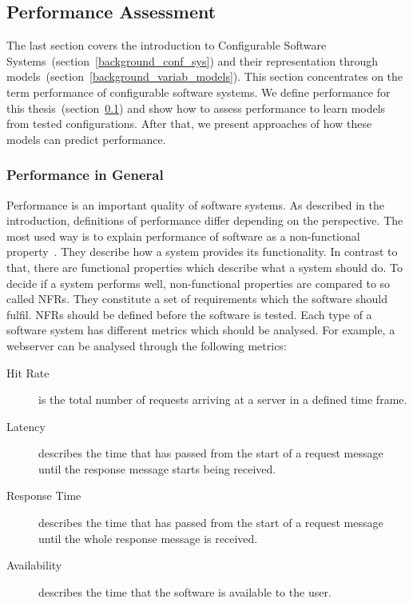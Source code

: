 \subsection{Performance Assessment}
\label{background_perf}

The last section covers the introduction to Configurable Software Systems~(section~\ref{background_conf_sys}) and their representation through models~(section~\ref{background_variab_models}). 
This section concentrates on the term performance of configurable software systems. 
We define performance for this thesis~(section~\ref{background_perf}) and show how to assess performance to learn models from tested configurations. 
After that, we present approaches of how these models can predict performance.

\subsubsection{Performance in General}
\label{perf_general}

Performance is an important quality of software systems. 
As described in the introduction, definitions of performance differ depending on the perspective. 
The most used way is to explain performance of software as a non-functional property~\cite{Molyneaux:2009:AAP:1550832,liggesmeyer2002software}. 
They describe how a system provides its functionality. 
In contrast to that, there are functional properties which describe what a system should do. 
To decide if a system performs well, non-functional properties are compared to so called \acp{NFR}. 
They constitute a set of requirements which the software should fulfil. 
\acp{NFR} should be defined before the software is tested. 
Each type of a software system has different metrics which should be analysed. 
For example, a webserver can be analysed through the following metrics:

\begin{description}
	\item [Hit Rate] is the total number of requests arriving at a server in a defined time frame.
	\item [Latency] describes the time that has passed from the start of a request message until the response message starts being received.
	\item [Response Time] describes the time that has passed from the start of a request message until the whole response message is received.
	\item [Availability] describes the time that the software is available to the user.
\end{description}

